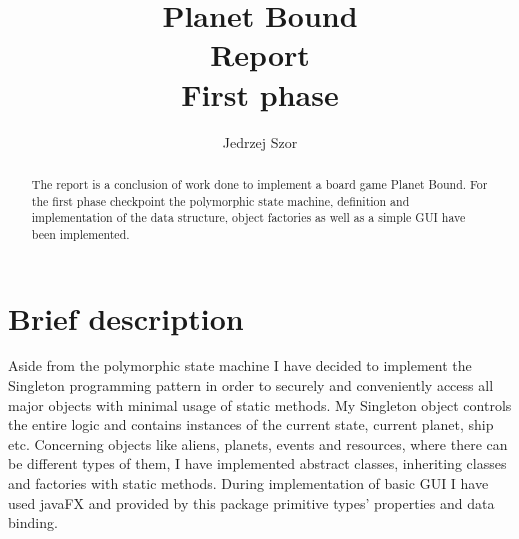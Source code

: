 \documentclass[a4paper,12pt]{article}
\begin{document}
	
\title{Planet Bound\\Report\\First phase}
\author{Jedrzej Szor}

\maketitle

\begin{abstract}
The report is a conclusion of work done to implement a board game Planet Bound. For the first phase checkpoint the polymorphic state machine, definition and implementation of the data structure, object factories as well as a simple GUI have been implemented.
\end{abstract}

\section{Brief description}
Aside from the polymorphic state machine I have decided to implement the Singleton programming pattern in order to securely and conveniently access all major objects with minimal usage of static methods. My Singleton object controls the entire logic and contains instances of the current state, current planet, ship etc. Concerning objects like aliens, planets, events and resources, where there can be different types of them, I have implemented abstract classes, inheriting classes and factories with static methods. During implementation of basic GUI I have used javaFX and provided by this package primitive types' properties and data binding.   

\newpage
\end{document}
